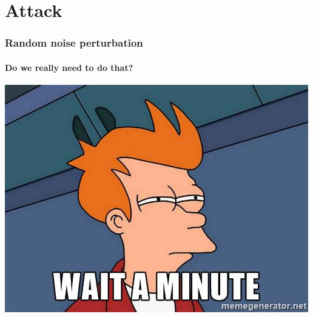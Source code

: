 \documentclass[9pt]{beamer}
\begin{document}
\section{Attack}



\begin{frame}
  \frametitle{Random noise perturbation}

  \framesubtitle{Do we really need to do that?}

  \begin{center}
    \includegraphics[width = 0.7 \linewidth]{images/wait-a-minute.jpg}
  \end{center}
\end{frame}
\end{document}
